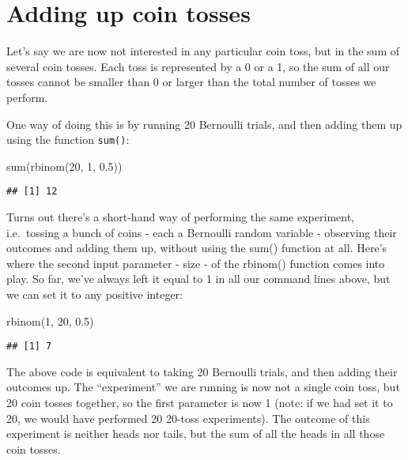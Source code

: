 \documentclass[
]{book}
\newenvironment{Shaded}{\begin{snugshade}}{\end{snugshade}}
\newcommand{\DecValTok}[1]{\textcolor[rgb]{0.00,0.00,0.81}{#1}}
\newcommand{\FloatTok}[1]{\textcolor[rgb]{0.00,0.00,0.81}{#1}}
\newcommand{\FunctionTok}[1]{\textcolor[rgb]{0.00,0.00,0.00}{#1}}
\newcommand{\NormalTok}[1]{#1}
\begin{document}
\hypertarget{adding-up-coin-tosses}{%
\section{Adding up coin tosses}\label{adding-up-coin-tosses}}

Let's say we are now not interested in any particular coin toss, but in the sum of several coin tosses. Each toss is represented by a 0 or a 1, so the sum of all our tosses cannot be smaller than 0 or larger than the total number of tosses we perform.

One way of doing this is by running 20 Bernoulli trials, and then adding them up using the function \texttt{sum()}:

\begin{Shaded}
\begin{Highlighting}[]
\FunctionTok{sum}\NormalTok{(}\FunctionTok{rbinom}\NormalTok{(}\DecValTok{20}\NormalTok{, }\DecValTok{1}\NormalTok{, }\FloatTok{0.5}\NormalTok{))}
\end{Highlighting}
\end{Shaded}

\begin{verbatim}
## [1] 12
\end{verbatim}

Turns out there's a short-hand way of performing the same experiment, i.e.~tossing a bunch of coins - each a Bernoulli random variable - observing their outcomes and adding them up, without using the sum() function at all. Here's where the second input parameter - size - of the rbinom() function comes into play. So far, we've always left it equal to 1 in all our command lines above, but we can set it to any positive integer:

\begin{Shaded}
\begin{Highlighting}[]
\FunctionTok{rbinom}\NormalTok{(}\DecValTok{1}\NormalTok{, }\DecValTok{20}\NormalTok{, }\FloatTok{0.5}\NormalTok{)}
\end{Highlighting}
\end{Shaded}

\begin{verbatim}
## [1] 7
\end{verbatim}

The above code is equivalent to taking 20 Bernoulli trials, and then adding their outcomes up. The ``experiment'' we are running is now not a single coin toss, but 20 coin tosses together, so the first parameter is now 1 (note: if we had set it to 20, we would have performed 20 20-toss experiments). The outcome of this experiment is neither heads nor tails, but the sum of all the heads in all those coin tosses.
\end{document}
